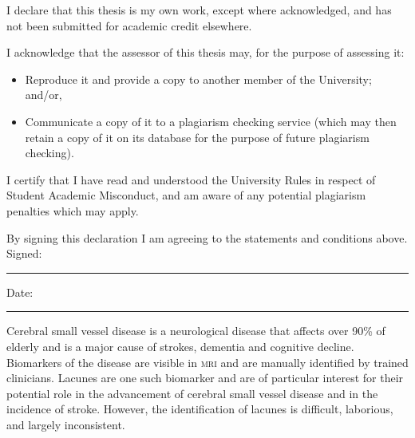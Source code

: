 \beforepreface



\vskip 10pc \noindent I declare that this thesis is my
own work, except where acknowledged, and has not been submitted for
academic credit elsewhere. 

\vskip 2pc  \noindent I acknowledge that the assessor of this
thesis may, for the purpose of assessing it:
\begin{itemize}
\item Reproduce it and provide a copy to another member of the University; and/or,
\item Communicate a copy of it to a plagiarism checking service (which may then retain a copy of it on its database for the purpose of future plagiarism checking).
\end{itemize}

\vskip 2pc \noindent I certify that I have read and understood the University Rules in
respect of Student Academic Misconduct, and am aware of any potential plagiarism penalties which may 
apply.\vspace{24pt}

\vskip 2pc \noindent By signing this declaration I am agreeing to the statements and conditions above.
\vskip 2pc
Signed: \rule{7cm}{0.25pt} \hfill Date: \rule{4cm}{0.25pt}

\afterpage{\blankpage}




%
%
%
%

\afterpage{\blankpage}



Cerebral small vessel disease is a neurological disease that affects over 90\% of elderly and is a major cause of strokes, dementia and cognitive decline. Biomarkers of the disease are visible in \textsc{mri} and are manually identified by trained clinicians. Lacunes are one such biomarker and are of particular interest for their potential role in the advancement of cerebral small vessel disease and in the incidence of stroke. However, the identification of lacunes is difficult, laborious, and largely inconsistent.

